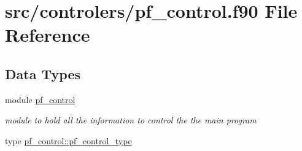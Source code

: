 \hypertarget{pf__control_8f90}{\section{src/controlers/pf\-\_\-control.f90 File Reference}
\label{pf__control_8f90}
}
\subsection*{Data Types}
\begin{DoxyCompactItemize}
\item 
module \hyperlink{classpf__control}{pf\-\_\-control}
\begin{DoxyCompactList}\small\item\em module to hold all the information to control the the main program \end{DoxyCompactList}\item 
type \hyperlink{structpf__control_1_1pf__control__type}{pf\-\_\-control\-::pf\-\_\-control\-\_\-type}
\end{DoxyCompactItemize}
